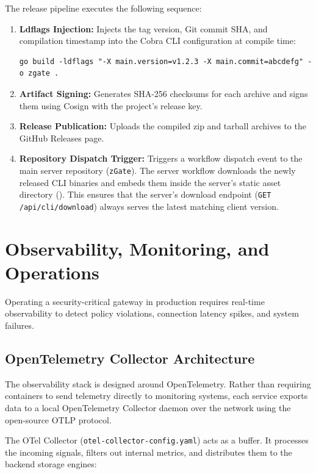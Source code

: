 The release pipeline executes the following sequence:
\begin{enumerate}
    \item \textbf{Ldflags Injection:} Injects the tag version, Git commit SHA, and compilation timestamp into the Cobra CLI configuration at compile time:
    \begin{verbatim}
go build -ldflags "-X main.version=v1.2.3 -X main.commit=abcdefg" -o zgate .
    \end{verbatim}
    \item \textbf{Artifact Signing:} Generates SHA-256 checksums for each archive and signs them using Cosign with the project's release key.
    \item \textbf{Release Publication:} Uploads the compiled zip and tarball archives to the GitHub Releases page.
    \item \textbf{Repository Dispatch Trigger:} Triggers a workflow dispatch event to the main server repository (\texttt{zGate}). The server workflow downloads the newly released CLI binaries and embeds them inside the server's static asset directory (). This ensures that the server's download endpoint (\texttt{GET /api/cli/download}) always serves the latest matching client version.
\end{enumerate}

\section{Observability, Monitoring, and Operations}
Operating a security-critical gateway in production requires real-time observability to detect policy violations, connection latency spikes, and system failures.

\subsection{OpenTelemetry Collector Architecture}
The observability stack is designed around OpenTelemetry. Rather than requiring containers to send telemetry directly to monitoring systems, each service exports data to a local OpenTelemetry Collector daemon over the network using the open-source OTLP protocol.

The OTel Collector (\texttt{otel-collector-config.yaml}) acts as a buffer. It processes the incoming signals, filters out internal metrics, and distributes them to the backend storage engines:

